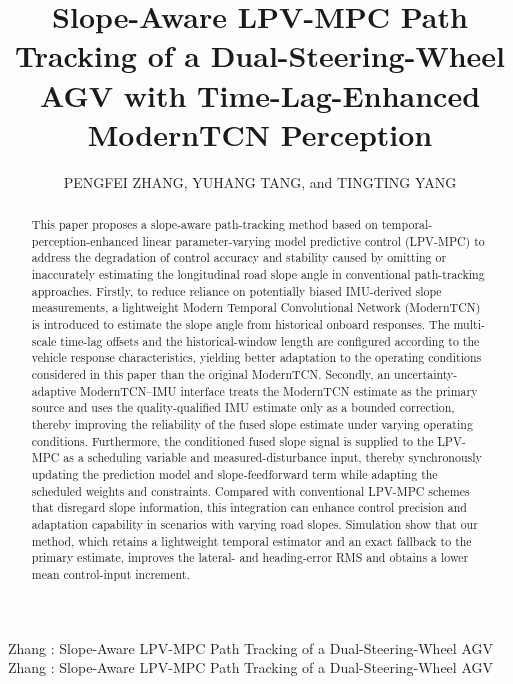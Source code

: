 \documentclass{ieeeaccess}
\begin{document}

\title{Slope-Aware LPV-MPC Path Tracking of a Dual-Steering-Wheel AGV with Time-Lag-Enhanced ModernTCN Perception}
\author{\uppercase{Pengfei Zhang},
\uppercase{Yuhang Tang}, and
\uppercase{Tingting Yang}}
\address[1]{Huzhou Key Laboratory of Intelligent Sensing and Optimal Control for Industrial Systems, School of Engineering, Huzhou Normal University, Huzhou 313000, China}
\address[2]{Zhejiang Key Laboratory of Industrial Solid Waste Thermal Hydrolysis Technology and Intelligent Equipment, Huzhou Normal University, Huzhou 313000, China}


\markboth
{Zhang \headeretal: Slope-Aware LPV-MPC Path Tracking of a Dual-Steering-Wheel AGV}
{Zhang \headeretal: Slope-Aware LPV-MPC Path Tracking of a Dual-Steering-Wheel AGV}


\begin{abstract}

This paper proposes a slope-aware path-tracking method based on temporal-perception-enhanced linear parameter-varying model predictive control (LPV-MPC) to address the degradation of control accuracy and stability caused by omitting or inaccurately estimating the longitudinal road slope angle in conventional path-tracking approaches. Firstly, to reduce reliance on potentially biased IMU-derived slope measurements, a lightweight Modern Temporal Convolutional Network (ModernTCN) is introduced to estimate the slope angle from historical onboard responses. The multi-scale time-lag offsets and the historical-window length are configured according to the vehicle response characteristics, yielding better adaptation to the operating conditions considered in this paper than the original ModernTCN. Secondly, an uncertainty-adaptive ModernTCN--IMU interface treats the ModernTCN estimate as the primary source and uses the quality-qualified IMU estimate only as a bounded correction, thereby improving the reliability of the fused slope estimate under varying operating conditions. Furthermore, the conditioned fused slope signal is supplied to the LPV-MPC as a scheduling variable and measured-disturbance input, thereby synchronously updating the prediction model and slope-feedforward term while adapting the scheduled weights and constraints. Compared with conventional LPV-MPC schemes that disregard slope information, this integration can enhance control precision and adaptation capability in scenarios with varying road slopes.  Simulation show that our method, which retains a lightweight temporal estimator and an exact fallback to the primary estimate, improves the lateral- and heading-error RMS and obtains a lower mean control-input increment.
\end{abstract}
\end{document}
